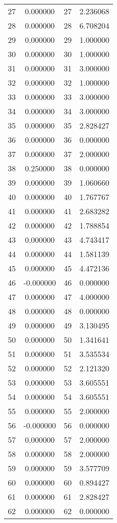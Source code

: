 \documentclass[12pt]{article}
\begin{document}
\begin{longtable}{@{}cccc@{}}
27 & 0.000000 & 27 & 2.236068 \\
28 & 0.000000 & 28 & 6.708204 \\
29 & 0.000000 & 29 & 1.000000 \\
30 & 0.000000 & 30 & 1.000000 \\
31 & 0.000000 & 31 & 3.000000 \\
32 & 0.000000 & 32 & 1.000000 \\
33 & 0.000000 & 33 & 3.000000 \\
34 & 0.000000 & 34 & 3.000000 \\
35 & 0.000000 & 35 & 2.828427 \\
36 & 0.000000 & 36 & 0.000000 \\
37 & 0.000000 & 37 & 2.000000 \\
38 & 0.250000 & 38 & 0.000000 \\
39 & 0.000000 & 39 & 1.060660 \\
40 & 0.000000 & 40 & 1.767767 \\
41 & 0.000000 & 41 & 2.683282 \\
42 & 0.000000 & 42 & 1.788854 \\
43 & 0.000000 & 43 & 4.743417 \\
44 & 0.000000 & 44 & 1.581139 \\
45 & 0.000000 & 45 & 4.472136 \\
46 & -0.000000 & 46 & 0.000000 \\
47 & 0.000000 & 47 & 4.000000 \\
48 & 0.000000 & 48 & 0.000000 \\
49 & 0.000000 & 49 & 3.130495 \\
50 & 0.000000 & 50 & 1.341641 \\
51 & 0.000000 & 51 & 3.535534 \\
52 & 0.000000 & 52 & 2.121320 \\
53 & 0.000000 & 53 & 3.605551 \\
54 & 0.000000 & 54 & 3.605551 \\
55 & 0.000000 & 55 & 2.000000 \\
56 & -0.000000 & 56 & 0.000000 \\
57 & 0.000000 & 57 & 2.000000 \\
58 & 0.000000 & 58 & 2.000000 \\
59 & 0.000000 & 59 & 3.577709 \\
60 & 0.000000 & 60 & 0.894427 \\
61 & 0.000000 & 61 & 2.828427 \\
62 & 0.000000 & 62 & 0.000000 \\

\end{longtable}
\end{document}
